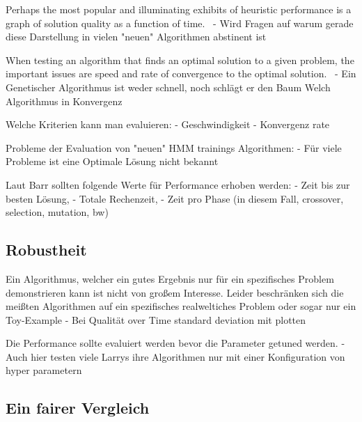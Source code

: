 
Perhaps the most popular and illuminating exhibits of heuristic performance is a graph 
of solution quality as a function of time.~\cite*{ComparisonGuidelines}
- Wird Fragen auf warum gerade diese Darstellung in vielen "neuen" Algorithmen 
abstinent ist

When testing an algorithm that finds an optimal solution to 
a given problem, the important issues are speed and rate of convergence to the optimal 
solution.~\cite*{ComparisonGuidelines}
- Ein Genetischer Algorithmus ist weder schnell, noch schlägt er den Baum Welch Algorithmus in Konvergenz



Welche Kriterien kann man evaluieren:
- Geschwindigkeit
- Konvergenz rate


Probleme der Evaluation von "neuen" HMM trainings Algorithmen:
- Für viele Probleme ist eine Optimale Lösung nicht bekannt


Laut Barr sollten folgende Werte für Performance erhoben werden:
- Zeit bis zur besten Lösung,
- Totale Rechenzeit,
- Zeit pro Phase (in diesem Fall, crossover, selection, mutation, bw)


\subsection*{Robustheit}
Ein Algorithmus, welcher ein gutes Ergebnis nur für ein spezifisches Problem demonstrieren kann
ist nicht von großem Interesse.
Leider beschränken sich die meißten Algorithmen auf ein spezifisches realweltiches Problem oder 
sogar nur ein Toy-Example
- Bei Qualität over Time standard deviation mit plotten

Die Performance sollte evaluiert werden bevor die Parameter getuned werden.
- Auch hier testen viele Larrys ihre Algorithmen nur mit einer Konfiguration von hyper parametern

\subsection*{Ein fairer Vergleich}


